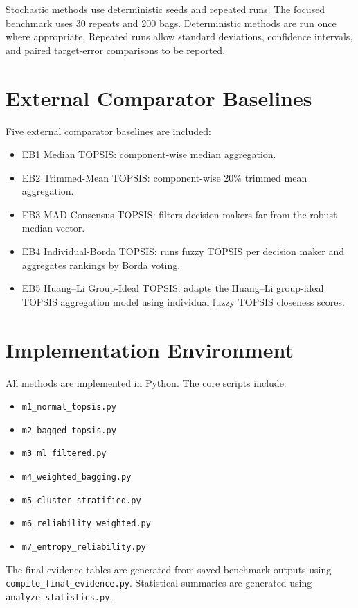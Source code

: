 Stochastic methods use deterministic seeds and repeated runs. The focused benchmark uses 30 repeats and 200 bags. Deterministic methods are run once where appropriate. Repeated runs allow standard deviations, confidence intervals, and paired target-error comparisons to be reported.

\section{External Comparator Baselines}

Five external comparator baselines are included:

\begin{itemize}
    \item EB1 Median TOPSIS: component-wise median aggregation.
    \item EB2 Trimmed-Mean TOPSIS: component-wise 20\% trimmed mean aggregation.
    \item EB3 MAD-Consensus TOPSIS: filters decision makers far from the robust median vector.
    \item EB4 Individual-Borda TOPSIS: runs fuzzy TOPSIS per decision maker and aggregates rankings by Borda voting.
    \item EB5 Huang--Li Group-Ideal TOPSIS: adapts the Huang--Li group-ideal TOPSIS aggregation model using individual fuzzy TOPSIS closeness scores.
\end{itemize}

\section{Implementation Environment}

All methods are implemented in Python. The core scripts include:

\begin{itemize}
    \item \texttt{m1\_normal\_topsis.py}
    \item \texttt{m2\_bagged\_topsis.py}
    \item \texttt{m3\_ml\_filtered.py}
    \item \texttt{m4\_weighted\_bagging.py}
    \item \texttt{m5\_cluster\_stratified.py}
    \item \texttt{m6\_reliability\_weighted.py}
    \item \texttt{m7\_entropy\_reliability.py}
\end{itemize}

The final evidence tables are generated from saved benchmark outputs using \texttt{compile\_final\_evidence.py}. Statistical summaries are generated using \texttt{analyze\_statistics.py}.
